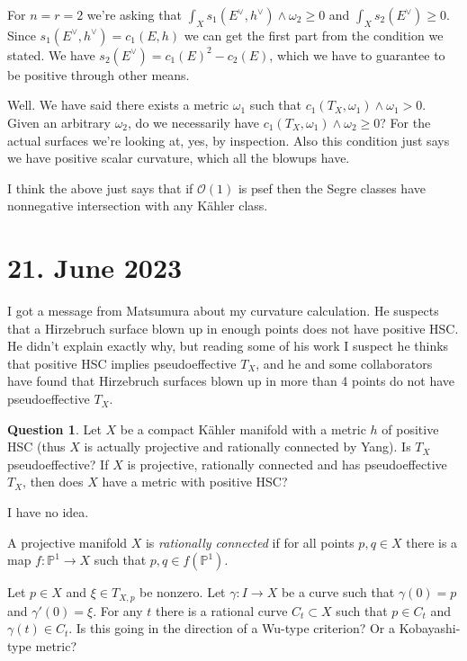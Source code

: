 \documentclass[11pt]{amsart}
\theoremstyle{definition}
\newcommand{\kk}[1]{\mathbb{#1}}
\newcommand{\cc}[1]{\mathcal{#1}}
\newtheorem{question}{Question}
\begin{document}
For $n = r = 2$ we're asking that $\int_X s_1(E^\vee, h^\vee) \wedge \omega_2
\geq 0$ and $\int_X s_2(E^\vee) \geq 0$.
Since $s_1(E^\vee, h^\vee) = c_1(E,h)$ we can get the first part from the
condition we stated.
We have $s_2(E^\vee) = c_1(E)^2 - c_2(E)$, which we have to guarantee to be
positive through other means.

Well. We have said there exists a metric $\omega_1$ such that
$c_1(T_X,\omega_1) \wedge \omega_1 > 0$.
Given an arbitrary $\omega_2$, do we necessarily have $c_1(T_X,\omega_1) \wedge
\omega_2 \geq 0$?
For the actual surfaces we're looking at, yes, by inspection.
Also this condition just says we have positive scalar curvature, which
all the blowups have.

I think the above just says that if $\cc O(1)$ is psef then the Segre classes
have nonnegative intersection with any K\"ahler class.


\section{21. June 2023}

I got a message from Matsumura about my curvature calculation.
He suspects that a Hirzebruch surface blown up in enough points does not
have positive HSC.
He didn't explain exactly why, but reading some of his work I suspect he
thinks that positive HSC implies pseudoeffective $T_X$, and he and some
collaborators have found that Hirzebruch surfaces blown up in more than 4 points
do not have pseudoeffective $T_X$.

\begin{question}
Let $X$ be a compact K\"ahler manifold with a metric $h$ of positive HSC
(thus $X$ is actually projective and rationally connected by Yang).
Is $T_X$ pseudoeffective?
If $X$ is projective, rationally connected and has pseudoeffective $T_X$,
then does $X$ have a metric with positive HSC?
\end{question}

I have no idea.

A projective manifold $X$ is \emph{rationally connected} if for all points
$p,q \in X$ there is a map $f : \kk P^1 \to X$ such that $p, q \in f(\kk P^1)$.

Let $p \in X$ and $\xi \in T_{X,p}$ be nonzero.
Let $\gamma : I \to X$ be a curve such that $\gamma(0) = p$ and $\gamma'(0) = \xi$.
For any $t$ there is a rational curve $C_t \subset X$ such that $p \in C_t$ and $\gamma(t) \in C_t$.
Is this going in the direction of a Wu-type criterion?
Or a Kobayashi-type metric?
\end{document}
